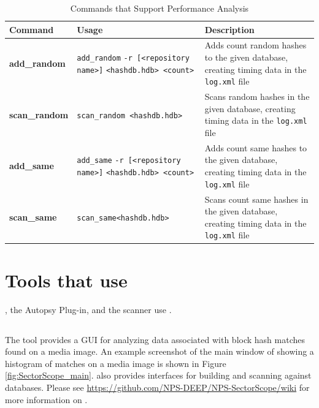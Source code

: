 \documentclass[11pt,fleqn]{article} %
\begin{document}
\begin{table}[!ht]
\centering
\caption{Commands that Support \hdb Performance Analysis}
\label{tab:analysis}
\begin{tabular}{|p{3.5 cm}|p{6 cm}|p{4 cm}|}
\hline \hline
\textbf{Command} & \textbf{Usage} & \textbf{Description} \\
\hline
\textbf{add\_random} & \verb+add_random+ \verb+-r [<repository name>]+ \verb+<hashdb.hdb> <count>+ & Adds count random hashes to the given database, creating timing data in the \texttt{log.xml} file\\
\hline
\textbf{scan\_random} & \verb+scan_random <hashdb.hdb>+ & Scans random hashes in the given database, creating timing data in the \texttt{log.xml} file\\
\hline
\textbf{add\_same} & \verb+add_same+ \verb+-r [<repository name>]+ \verb+<hashdb.hdb> <count>+ & Adds count same hashes to the given database, creating timing data in the \texttt{log.xml} file\\
\hline
\textbf{scan\_same} & \verb+scan_same<hashdb.hdb>+ & Scans count same hashes in the given database, creating timing data in the \texttt{log.xml} file\\
\hline
\end{tabular}
\end{table}

\section{Tools that use \hdb}
\label{OtherTools}
\sscope, the \sscope Autopsy Plug-in, and the \bulk \hdb scanner use \hdb.

\subsection{\sscope}
The \sscope tool provides a GUI for analyzing data associated with block hash matches found on a media image. An example screenshot of the main window of \sscope showing a histogram of matches on a media image is shown in Figure \ref{fig:SectorScope_main}. \sscope also provides interfaces for building and scanning against \hdb databases. Please see \url{https://github.com/NPS-DEEP/NPS-SectorScope/wiki} for more information on \sscope.
\end{document}
